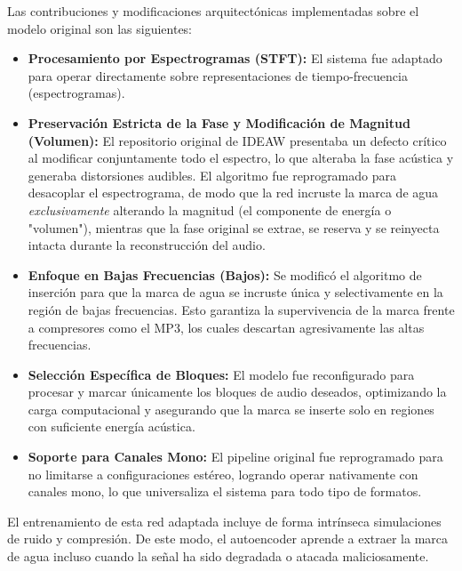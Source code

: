 Las contribuciones y modificaciones arquitectónicas implementadas sobre el modelo original son las siguientes:
\begin{itemize}
    \item \textbf{Procesamiento por Espectrogramas (STFT):} El sistema fue adaptado para operar directamente sobre representaciones de tiempo-frecuencia (espectrogramas). 
    \item \textbf{Preservación Estricta de la Fase y Modificación de Magnitud (Volumen):} El repositorio original de IDEAW presentaba un defecto crítico al modificar conjuntamente todo el espectro, lo que alteraba la fase acústica y generaba distorsiones audibles. El algoritmo fue reprogramado para desacoplar el espectrograma, de modo que la red incruste la marca de agua \textit{exclusivamente} alterando la magnitud (el componente de energía o "volumen"), mientras que la fase original se extrae, se reserva y se reinyecta intacta durante la reconstrucción del audio.
    \item \textbf{Enfoque en Bajas Frecuencias (Bajos):} Se modificó el algoritmo de inserción para que la marca de agua se incruste única y selectivamente en la región de bajas frecuencias. Esto garantiza la supervivencia de la marca frente a compresores como el MP3, los cuales descartan agresivamente las altas frecuencias.
    \item \textbf{Selección Específica de Bloques:} El modelo fue reconfigurado para procesar y marcar únicamente los bloques de audio deseados, optimizando la carga computacional y asegurando que la marca se inserte solo en regiones con suficiente energía acústica.
    \item \textbf{Soporte para Canales Mono:} El pipeline original fue reprogramado para no limitarse a configuraciones estéreo, logrando operar nativamente con canales mono, lo que universaliza el sistema para todo tipo de formatos.
\end{itemize}

El entrenamiento de esta red adaptada incluye de forma intrínseca simulaciones de ruido y compresión. De este modo, el autoencoder aprende a extraer la marca de agua incluso cuando la señal ha sido degradada o atacada maliciosamente.

